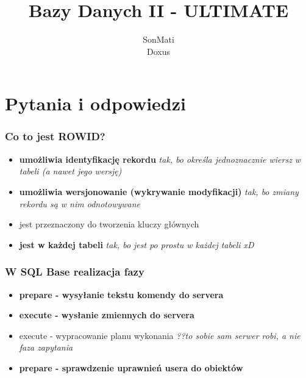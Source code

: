 \documentclass[a4paper,twoside]{article}
\begin{document}
  

  \begin{titlepage}
  \title{\huge Bazy Danych II - ULTIMATE}
  \author{\large SonMati \\ \large Doxus}
  \maketitle
  \end{titlepage}

  \part*{Pytania i odpowiedzi}
  \section{Co to jest ROWID?}
      \begin{itemize}
      \item[] \textbf{umożliwia identyfikację rekordu} \emph{tak, bo określa jednoznacznie wiersz w tabeli (a nawet jego wersję)}
      \item[] \textbf{umożliwia wersjonowanie (wykrywanie modyfikacji)} \emph{tak, bo zmiany rekordu są w nim odnotowywane}
      \item jest przeznaczony do tworzenia kluczy głównych
      \item \textbf{jest w każdej tabeli} \emph{tak, bo jest po prostu w każdej tabeli xD}
      \end{itemize}

  \section{W SQL Base realizacja fazy}
      \begin{itemize}
      \item \textbf{prepare - wysyłanie tekstu komendy do servera}
      \item \textbf{execute - wysłanie zmiennych do servera}
      \item execute - wypracowanie planu wykonania \emph{??to sobie sam serwer robi, a nie faza zapytania}
      \item \textbf{prepare - sprawdzenie uprawnień usera do obiektów}
      \end{itemize}
\end{document}

